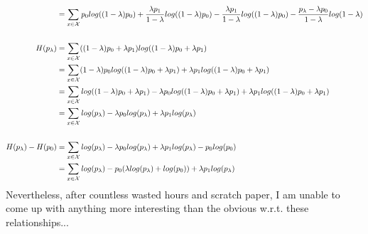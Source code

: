 \documentclass{article}
\begin{document}
\begin{align*}
&= \sum_{x \in  \mathcal{X}} p_0 log((1 - \lambda) p_0) + \frac{\lambda p_1}{1- \lambda} log((1 - \lambda) p_0) - \frac{\lambda p_1}{1- \lambda}log((1- \lambda) p_0) - \frac{p_\lambda - \lambda p_0}{1- \lambda} log(1- \lambda)\\
\\
H(p_\lambda) &= \sum_{x \in  \mathcal{X}} ((1-\lambda)p_0 + \lambda p_1) log((1-\lambda) p_0 + \lambda p_1)\\
&= \sum_{x \in  \mathcal{X}} (1-\lambda)p_0 log((1-\lambda) p_0 + \lambda p_1)
 + \lambda p_1 log((1-\lambda) p_0 + \lambda p_1)\\
 &= \sum_{x \in  \mathcal{X}} log((1-\lambda) p_0 + \lambda p_1) - \lambda p_0 log((1-\lambda) p_0 + \lambda p_1)
 + \lambda p_1 log((1-\lambda) p_0 + \lambda p_1)\\
  &= \sum_{x \in  \mathcal{X}} log(p_\lambda) - \lambda p_0 log(p_\lambda) + \lambda p_1 log(p_\lambda)\\
  \\
  H(p_\lambda) -H(p_0) &= \sum_{x \in  \mathcal{X}} log(p_\lambda) - \lambda p_0 log(p_\lambda) + \lambda p_1 log(p_\lambda) - p_0log(p_0)\\
  &= \sum_{x \in  \mathcal{X}} log(p_\lambda) - p_0(\lambda log(p_\lambda) + log(p_0)) + \lambda p_1 log(p_\lambda) 
\end{align*}
Nevertheless, after countless wasted hours and scratch paper, I am unable to come up with anything more interesting than the obvious w.r.t. these relationships...

\newpage
\end{document}

